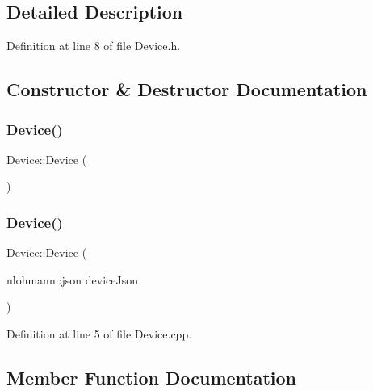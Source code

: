 \subsection{Detailed Description}


Definition at line 8 of file Device.\+h.



\subsection{Constructor \& Destructor Documentation}
\mbox{\label{class_device_a64ba12dcc5f4267486c5d545d04dcf68}} 
\subsubsection{\texorpdfstring{Device()}{Device()}\hspace{0.1cm}{\footnotesize\ttfamily [1/2]}}
{\footnotesize\ttfamily Device\+::\+Device (\begin{DoxyParamCaption}{ }\end{DoxyParamCaption})\hspace{0.3cm}{\ttfamily [default]}}

\mbox{\label{class_device_a0956ff0cb54658d2b4cc43eaae1c0540}} 
\subsubsection{\texorpdfstring{Device()}{Device()}\hspace{0.1cm}{\footnotesize\ttfamily [2/2]}}
{\footnotesize\ttfamily Device\+::\+Device (\begin{DoxyParamCaption}\item[{nlohmann\+::json}]{device\+Json }\end{DoxyParamCaption})}



Definition at line 5 of file Device.\+cpp.



\subsection{Member Function Documentation}
\mbox{\label{class_device_aa356c49000a4a7eea1d014dd5245ff51}} 
